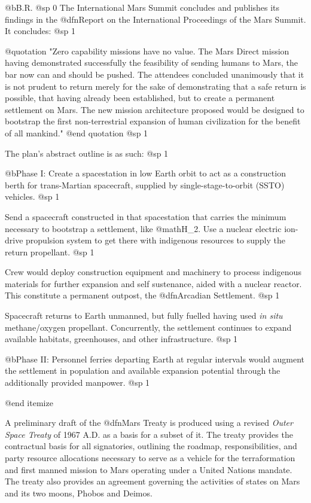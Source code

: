@b{B.R.}
@sp 0
The International Mars Summit concludes and publishes its findings in the @dfn{Report on the International Proceedings of the Mars Summit}. It concludes:
@sp 1

@quotation
"Zero capability missions have no value. The Mars Direct mission having demonstrated successfully the feasibility of sending humans to Mars, the bar now can and should be pushed. The attendees concluded unanimously that it is not prudent to return merely for the sake of demonstrating that a safe return is possible, that having already been established, but to create a permanent settlement on Mars. The new mission architecture proposed would be designed to bootstrap the first non-terrestrial expansion of human civilization for the benefit of all mankind."
@end quotation
@sp 1

The plan's abstract outline is as such:
@sp 1
\itemize
\item
@b{Phase I:} Create a spacestation in low Earth orbit to act as a construction berth for trans-Martian spacecraft, supplied by single-stage-to-orbit (SSTO) vehicles.
@sp 1

\item
Send a spacecraft constructed in that spacestation that carries the minimum necessary to bootstrap a settlement, like @math{H_2}. Use a nuclear electric ion-drive propulsion system to get there with indigenous resources to supply the return propellant.
@sp 1

\item
Crew would deploy construction equipment and machinery to process indigenous materials for further expansion and self sustenance, aided with a nuclear reactor. This constitute a permanent outpost, the @dfn{Arcadian Settlement}.
@sp 1

\item
Spacecraft returns to Earth unmanned, but fully fuelled having used {\it in situ} methane/oxygen propellant. Concurrently, the settlement continues to expand available habitats, greenhouses, and other infrastructure.
@sp 1

\item
@b{Phase II:} Personnel ferries departing Earth at regular intervals would augment the settlement in population and available expansion potential through the additionally provided manpower.
@sp 1

@end itemize

A preliminary draft of the @dfn{Mars Treaty} is produced using a revised {\it Outer Space Treaty} of 1967 A.D. as a basis for a subset of it. The treaty provides the contractual basis for all signatories, outlining the roadmap, responsibilities, and party resource allocations necessary to serve as a vehicle for the terraformation and first manned mission to Mars operating under a United Nations mandate. The treaty also provides an agreement governing the activities of states on Mars and its two moons, Phobos and Deimos.

